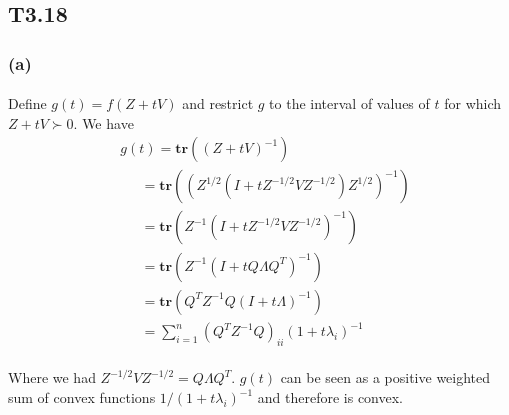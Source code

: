 \subsection*{T3.18}
\subsubsection*{(a)}
\paragraph{}
Define $g(t) =f(Z+tV)$ and restrict $g$ to the interval of values of $t$ for which $Z +tV \succ 0$. We have
\begin{align*}
&g(t) =\textbf{tr}( (Z+tV)^{-1}) \\
&\quad \ \ = \textbf{tr}((Z^{1/2}(I+tZ^{-1/2}VZ^{-1/2})Z^{1/2})^{-1}) \\
&\quad \ \ = \textbf{tr}(Z^{-1}(I+tZ^{-1/2}VZ^{-1/2})^{-1}) \\
&\quad \ \ = \textbf{tr}(Z^{-1}(I+tQ\Lambda Q^T)^{-1}) \\
&\quad \ \ = \textbf{tr}(Q^TZ^{-1}Q(I+t\Lambda)^{-1})  \\
&\quad \ \ = \sum_{i=1}^{n}(Q^TZ^{-1}Q)_{ii}(1+t\lambda_i)^{-1}
\end{align*}
\paragraph{}
Where we had $Z^{-1/2}VZ^{-1/2} = Q\Lambda Q^T$. $g(t)$ can be seen as a positive weighted sum of convex functions $1/(1+t\lambda_i)^{-1}$ and therefore is convex.